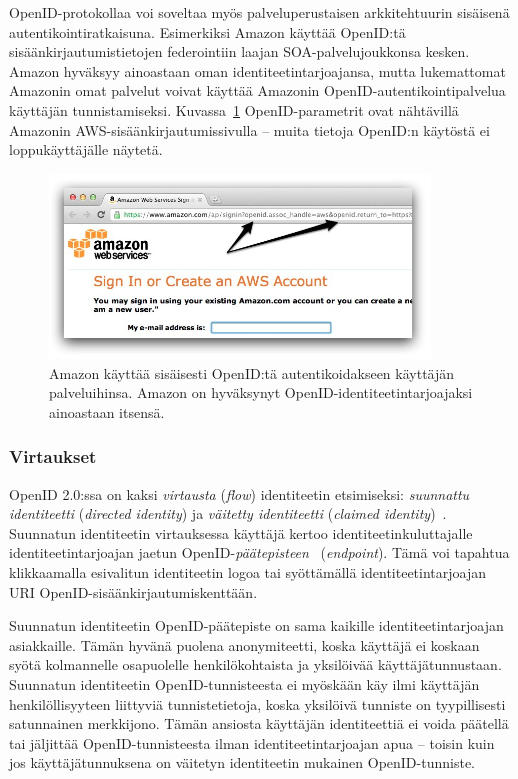 \documentclass[finnish,gradu]{tktltiki}
\begin{document}
  OpenID-protokollaa voi soveltaa myös palveluperustaisen arkkitehtuurin sisäisenä autentikointiratkaisuna. Esimerkiksi Amazon käyttää OpenID:tä sisäänkirjautumistietojen federointiin laajan SOA-palvelujoukkonsa kesken. Amazon hyväksyy ainoastaan oman identiteetintarjoajansa, mutta lukemattomat Amazonin omat palvelut voivat käyttää Amazonin OpenID-autentikointipalvelua käyttäjän tunnistamiseksi.  Kuvassa~\ref{fig:amazon_openid} OpenID-parametrit ovat nähtävillä Amazonin AWS-sisäänkirjautumissivulla -- muita tietoja OpenID:n käytöstä ei loppukäyttäjälle näytetä.

  \begin{figure}
    \centering
    \includegraphics[width=0.9\textwidth]{images/amazon_openid.jpg}
    \caption{Amazon käyttää sisäisesti OpenID:tä autentikoidakseen käyttäjän palveluihinsa. Amazon on hyväksynyt  OpenID-identiteetintarjoajaksi ainoastaan itsensä.}
    \label{fig:amazon_openid}
  \end{figure}


  \subsubsection{Virtaukset} %
  \label{ssub:openid_virtaukset}

  OpenID 2.0:ssa on kaksi \emph{virtausta} (\emph{flow}) identiteetin etsimiseksi: \emph{suunnattu identiteetti}  (\emph{directed identity}) ja \emph{väitetty identiteetti} (\emph{claimed identity})~\cite{hueniverse_openid_idps}. Suunnatun identiteetin virtauksessa käyttäjä kertoo identiteetinkuluttajalle identiteetintarjoajan jaetun OpenID-\emph{päätepisteen}~\cite{openid_discovery_recordon_2008} (\emph{endpoint}). Tämä voi tapahtua klikkaamalla esivalitun identiteetin logoa tai syöttämällä identiteetintarjoajan URI OpenID-sisäänkirjautumiskenttään.

  Suunnatun identiteetin OpenID-päätepiste on sama kaikille identiteetintarjoajan asiakkaille. Tämän hyvänä puolena anonymiteetti, koska käyttäjä ei koskaan syötä kolmannelle osapuolelle henkilökohtaista ja yksilöivää käyttäjätunnustaan. Suunnatun identiteetin OpenID-tunnisteesta ei myöskään käy ilmi käyttäjän henkilöllisyyteen liittyviä tunnistetietoja, koska yksilöivä tunniste on tyypillisesti satunnainen merkkijono. Tämän ansiosta käyttäjän identiteettiä ei voida päätellä tai jäljittää OpenID-tunnisteesta ilman identiteetintarjoajan apua -- toisin kuin jos käyttäjätunnuksena on väitetyn identiteetin mukainen OpenID-tunniste.
\end{document}
